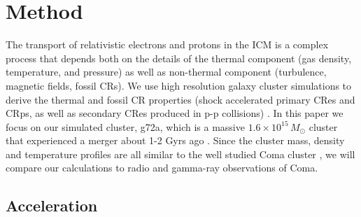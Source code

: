 \documentclass[useAMS,usenatbib]{mn2e}
\begin{document}
\section{Method} 

The transport of relativistic electrons and protons in
the ICM is a complex process that depends both on the details of the
thermal component (gas density, temperature, and pressure) as well as
non-thermal component (turbulence, magnetic fields, fossil CRs). We
use high resolution galaxy cluster simulations to derive the thermal
and fossil CR properties (shock accelerated primary CRes and CRps, as
well as secondary CRes produced in p-p collisions)
\citep{2007MNRAS.378..385P,pfrommer08,pinzke10,pinzke13}. In this
paper we focus on our simulated cluster, g72a, which is a massive
$1.6\times10^{15}\,M_\odot$ cluster that experienced a merger about
1-2 Gyrs ago \citep{2009MNRAS.399..497D}. Since the cluster mass,
density and temperature profiles are all similar to the well studied
Coma cluster \citep{2007MNRAS.378..385P,pinzke10}, we will compare our
calculations to radio and gamma-ray observations of Coma.

\subsection{Acceleration}
\end{document}
